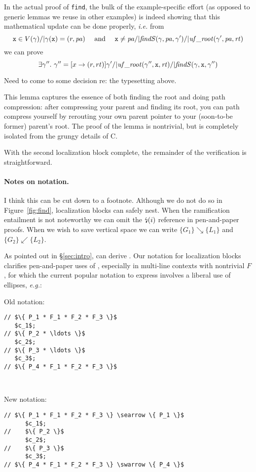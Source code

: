 In the actual proof of \texttt{find}, the bulk of the example-specific effort (as opposed to generic lemmas we reuse in other examples) is indeed showing that this mathematical update can be done properly, \emph{i.e.} from 
\[
\texttt{x} \in V(\gamma) /| \gamma(\texttt{x}) = (r,\mathit{pa}) \quad \text{ and } \quad
\texttt{x} \neq \mathit{pa} /|
\mathit{findS}(\gamma,\mathit{pa},\gamma') /| \mathit{uf\_root}(\gamma',\mathit{pa},\mathit{rt})
\]
we can prove
\[
\exists \gamma''.~ \gamma'' = [x -> (r,rt)]\gamma' /| \mathit{uf\_root}(\gamma'',\texttt{x},\mathit{rt}) /| \mathit{findS}(\gamma,\texttt{x},\gamma'')
\]

{\color{blue} Need to come to some decision re: the typesetting above.}

This lemma captures the essence of both finding the root and doing path compression: after compressing your parent and finding its root, you can path compress yourself by rerouting your own parent pointer to your (soon-to-be former) parent's root.  The proof of the lemma is nontrivial, but is completely isolated from the grungy details of C.

With the second localization block complete, the remainder of the verification is straightforward.

\paragraph{Notes on notation.} 

{\color{magenta} I think this can be cut down to a footnote.} Although we do not do so in Figure~\ref{fig:find}, localization blocks can safely nest.  When the ramification entailment is not noteworthy we can omit the $\mbox{\lightning}(i)$ reference in pen-and-paper proofs.  When we wish to save vertical space we can write $\{ G_1 \} \searrow \{ L_1 \}$ and $\{ G_2 \} \swarrow \{ L_2 \}$.

As pointed out in \S\ref{sec:intro},  can derive .  Our notation for localization blocks clarifies pen-and-paper uses of , especially in multi-line contexts with nontrivial $F$, for which the current popular notation to express  involves a liberal use of 
ellipses, \emph{e.g.}:

\vspace{5pt}

\begin{minipage}{.19\textwidth}
Old notation:
\begin{lstlisting}
// $\{ P_1 * F_1 * F_2 * F_3 \}$
   $c_1$;
// $\{ P_2 * \ldots \}$
   $c_2$;
// $\{ P_3 * \ldots \}$
   $c_3$;
// $\{ P_4 * F_1 * F_2 * F_3 \}$
\end{lstlisting}
\end{minipage} \quad \vline \; ~~~
\begin{minipage}{.2\textwidth}
New notation:
\begin{lstlisting}[numbers=none]
// $\{ P_1 * F_1 * F_2 * F_3 \} \searrow \{ P_1 \}$
      $c_1$;
//    $\{ P_2 \}$
      $c_2$;
//    $\{ P_3 \}$
      $c_3$;
// $\{ P_4 * F_1 * F_2 * F_3 \} \swarrow \{ P_4 \}$
\end{lstlisting}
\end{minipage}
\vspace{-0.75ex}

